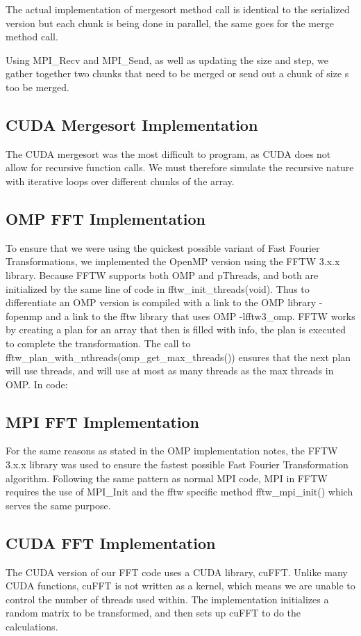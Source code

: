 \documentclass[conference,12pt]{IEEEtran}
\begin{document}
		The actual implementation of mergesort method call is identical to the serialized version but each chunk is being done in parallel, the same goes for the merge method call.

		Using MPI\_Recv and MPI\_Send, as well as updating the size and step, we gather together two chunks that need to be merged or send out a chunk of size s too be merged.
 

	\subsection{CUDA Mergesort Implementation}
		The CUDA mergesort was the most difficult to program, as CUDA does not allow for recursive function calls.  We must therefore simulate the recursive nature with iterative loops over different chunks of the array.

	\subsection{OMP FFT Implementation}
		To ensure that we were using the quickest possible variant of Fast Fourier Transformations, we implemented the OpenMP version using the FFTW 3.x.x library.  Because FFTW supports both OMP and pThreads, and both are initialized by the same line of code in fftw\_init\_threads(void).  Thus to differentiate an OMP version is compiled with a link to the OMP library -fopenmp and a link to the fftw library that uses OMP -lfftw3\_omp.   FFTW works by creating a plan for an array that then is filled with info, the plan is executed to complete the transformation.  The call to fftw\_plan\_with\_nthreads(omp\_get\_max\_threads()) ensures that the next plan will use threads, and will use at most as many threads as the max threads in OMP.  In code:

	\subsection{MPI FFT Implementation}
		For the same reasons as stated in the OMP implementation notes, the FFTW 3.x.x library was used to ensure the fastest possible Fast Fourier Transformation algorithm.  Following the same pattern as normal MPI code, MPI in FFTW requires the use of MPI\_Init and the fftw specific method fftw\_mpi\_init() which serves the same purpose.

	\subsection{CUDA FFT Implementation}
		The CUDA version of our FFT code uses a CUDA library, cuFFT.  Unlike many CUDA functions, cuFFT is not written as a kernel, which means we are unable to control the number of threads used within.  The implementation initializes a random matrix to be transformed, and then sets up cuFFT to do the calculations.
\end{document}
